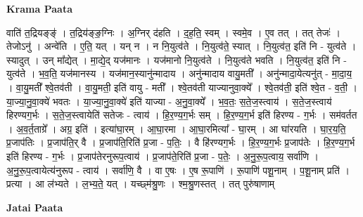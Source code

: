 \documentclass[17pt]{extarticle}
\begin{document}
\textbf{Krama Paata} \newline

वाति॑ त॒द्रियङ्ङ्॑ । त॒द्रिय॑ङ्ङ॒ग्निः । अ॒ग्निर् द॑हति । द॒ह॒ति॒ स्वम् । स्वमे॒व । ए॒व तत् । तत् तेजः॑ । तेजोऽनु॑ । अन्वे॑ति । ए॒ति॒ यत् । यन् न । न नि॒युत्व॑ते । नि॒युत्व॑ते॒ स्यात् । नि॒युत्व॑त॒ इति॑ नि - युत्व॑ते । स्यादुत् । उन् मा᳚द्येत् । मा॒द्ये॒द् यज॑मानः । यज॑मानो नि॒युत्व॑ते । नि॒युत्व॑ते भवति । नि॒युत्व॑त॒ इति॑ नि - युत्व॑ते । भ॒व॒ति॒ यज॑मानस्य । यज॑मान॒स्यानु॑न्मादाय । अनु॑न्मादाय वायु॒मती᳚ । अनु॑न्मादा॒येत्यनु॑त् - मा॒दा॒य॒ । वा॒यु॒मती᳚ श्वे॒तव॑ती । वा॒यु॒मती॒ इति॑ वायु - मती᳚ । श्वे॒तव॑ती याज्यानुवा॒क्ये᳚ । श्वे॒तव॑ती॒ इति॑ श्वे॒त - व॒ती॒ । या॒ज्या॒नु॒वा॒क्ये॑ भवतः । या॒ज्या॒नु॒वा॒क्ये॑ इति॑ याज्या - अ॒नु॒वा॒क्ये᳚ । भ॒व॒तः॒ स॒ते॒ज॒स्त्वाय॑ । स॒ते॒ज॒स्त्वाय॑ हिरण्यग॒र्भः । स॒ते॒ज॒स्त्वायेति॑ सतेजः - त्वाय॑ । हि॒र॒ण्य॒ग॒र्भः सम् । हि॒र॒ण्य॒ग॒र्भ इति॑ हिरण्य - ग॒र्भः । सम॑वर्तत । अ॒व॒र्त॒ताग्रे᳚ । अग्र॒ इति॑ । इत्या॑घा॒रम् । आ॒घा॒रमा । आ॒घा॒रमित्या᳚ - घा॒रम् । आ घा॑रयति । घा॒र॒य॒ति॒ प्र॒जाप॑तिः । प्र॒जाप॑ति॒र् वै । प्र॒जाप॑ति॒रिति॑ प्र॒जा - प॒तिः॒ । वै हि॑रण्यग॒र्भः । हि॒र॒ण्य॒ग॒र्भः प्र॒जाप॑तेः । हि॒र॒ण्य॒ग॒र्भ इति॑ हिरण्य - ग॒र्भः । प्र॒जाप॑तेरनुरूप॒त्वाय॑ । प्र॒जाप॑ते॒रिति॑ प्र॒जा - प॒तेः॒ । अ॒नु॒रू॒प॒त्वाय॒ सर्वा॑णि । अ॒नु॒रू॒प॒त्वायेत्य॑नुरूप - त्वाय॑ । सर्वा॑णि॒ वै । वा ए॒षः । ए॒ष रू॒पाणि॑ । रू॒पाणि॑ पशू॒नाम् । प॒शू॒नाम् प्रति॑ । प्रत्या । आ ल॑भ्यते । ल॒भ्य॒ते॒ यत् । यच्छ्म॑श्रु॒णः । श्म॒श्रु॒णस्तत् । तत् पुरु॑षाणाम् \newline

\textbf{Jatai Paata} \newline
\end{document}
